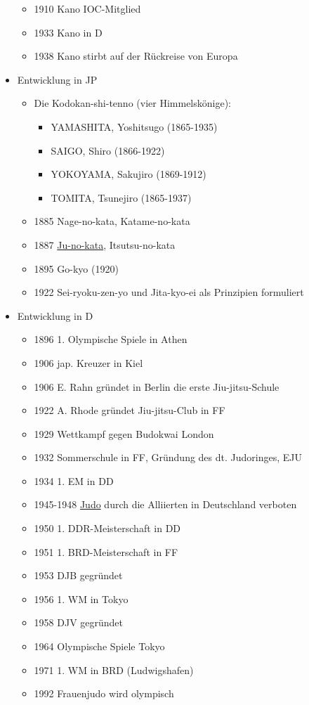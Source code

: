 \documentclass[justified, a4paper, notitlepage, captions=tableheading, nobib]{tufte-handout}
\begin{document}
\begin{itemize}
\begin{itemize}
\item 1910 Kano IOC-Mitglied
\item 1933 Kano in D
\item 1938 Kano stirbt auf der Rückreise von Europa
\end{itemize}
\item Entwicklung in JP
\begin{itemize}
\item Die Kodokan-shi-tenno (vier Himmelskönige):
\begin{itemize}
\item YAMASHITA, Yoshitsugo (1865-1935)
\item SAIGO, Shiro (1866-1922)
\item YOKOYAMA, Sakujiro (1869-1912)
\item TOMITA, Tsunejiro (1865-1937)
\end{itemize}
\item 1885 Nage-no-kata, Katame-no-kata
\item 1887 \hyperref[org4191c24]{Ju-no-kata}, Itsutsu-no-kata
\item 1895 Go-kyo (1920)
\item 1922 Sei-ryoku-zen-yo und Jita-kyo-ei als Prinzipien formuliert
\end{itemize}
\item Entwicklung in D
\begin{itemize}
\item 1896 1. Olympische Spiele in Athen
\item 1906 jap. Kreuzer in Kiel
\item 1906 E. Rahn gründet in Berlin die erste Jiu-jitsu-Schule
\item 1922 A. Rhode gründet Jiu-jitsu-Club in FF
\item 1929 Wettkampf gegen Budokwai London
\item 1932 Sommerschule in FF, Gründung des dt. Judoringes, EJU
\item 1934 1. EM in DD
\item 1945-1948 \hyperref[org39a3ee2]{Judo} durch die Alliierten in Deutschland verboten
\item 1950 1. DDR-Meisterschaft in DD
\item 1951 1. BRD-Meisterschaft in FF
\item 1953 DJB gegründet
\item 1956 1. WM in Tokyo
\item 1958 DJV gegründet
\item 1964 Olympische Spiele Tokyo
\item 1971 1. WM in BRD (Ludwigshafen)
\item 1992 Frauenjudo wird olympisch
\end{itemize}
\end{itemize}
\end{document}

